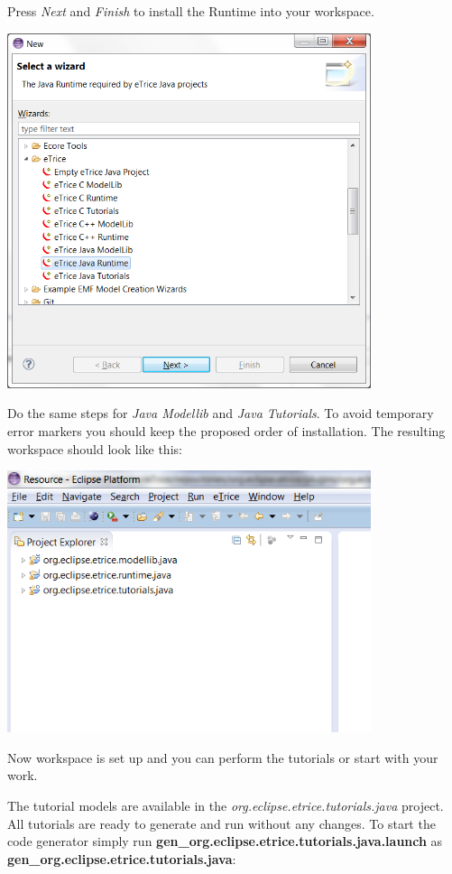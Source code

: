 Press \textit{Next} and \textit{Finish} to install the Runtime into your workspace.

\includegraphics[width=0.8\textwidth]{images/013-SetupWorkspace03.png}

Do the same steps for \textit{\eTrice{} Java Modellib} and \textit{\eTrice{} Java Tutorials}. To avoid temporary 
error markers you should keep the proposed order of installation. The resulting workspace should look like 
this:

\includegraphics[width=0.8\textwidth]{images/013-SetupWorkspace04.png}

Now workspace is set up and you can perform the tutorials or start with your work.

The tutorial models are available in the \textit{org.eclipse.etrice.tutorials.java} project. All tutorials are 
ready to generate and run without any changes. To start the code generator simply run 
\textbf{gen\_org.eclipse.etrice.tutorials.java.launch} as \textbf{gen\_org.eclipse.etrice.tutorials.java}: 


